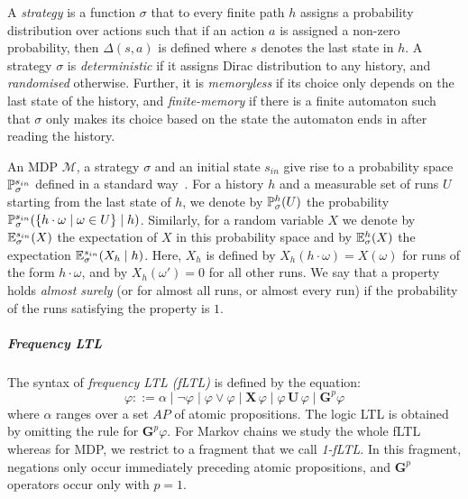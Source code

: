 \documentclass[a4paper,UKenglish]{lipics}
\newcommand{\mdp}{\mathcal{M}}
\newcommand{\tra}{\Delta}
\newcommand{\Gf}[1]{\mathbf{G}^{#1}}
\newcommand{\X}{\mathbf{X}\,}
\newcommand{\U}{\,\mathbf{U}\,}
\newcommand{\Ex}[3][]{\ifblank{#1}{\mathbb{E}_{#2}}{\mathbb{E}^{#1}_{#2}}(#3)}
\newcommand{\Prb}[2][]{\ifblank{#1}{\mathbb{P}_{#2}}{\mathbb{P}^{#1}_{#2}}}
\begin{document}
A {\em strategy} is a function $\sigma$ that to every finite path $h$ assigns a probability distribution over actions such that
if an action $a$ is assigned a non-zero probability, then $\tra(s,a)$ is defined where $s$ denotes the last state in $h$. A strategy $\sigma$ is {\em deterministic} if it assigns
Dirac distribution to any history, and {\em randomised} otherwise. Further, it is {\em memoryless} if its choice only depends on
the last state of the history, and {\em finite-memory} if there is a finite automaton such that $\sigma$ only makes its choice based on
the state the automaton ends in after reading the history.

An MDP $\mdp$, a strategy $\sigma$ and an initial state $s_{in}$ give rise to a probability space $\Prb[s_{in}]\sigma$ defined in a standard way~\cite{KSK76}. For a history $h$ and a measurable set of runs $U$ starting from the last state of $h$, we denote by $\Prb[h]{\sigma}(U)$ the probability
$\Prb[s_{in}]{\sigma}(\{h\cdot\omega \mid \omega \in U \} \mid h)$.
Similarly, for a random variable $X$ we denote by $\Ex[s_{in}]{\sigma}{X}$ the expectation of $X$ in this probability space and by $\Ex[h]{\sigma}{X}$ the expectation $\Ex[s_{in}]{\sigma}{X_h \mid h}$. Here, $X_h$ is defined by $X_h(h\cdot\omega) = X(\omega)$ for runs of the form $h\cdot \omega$, and by $X_h(\omega') = 0$ for all other runs.
We say that a property holds {\em almost surely} (or for almost all runs, or almost every run)
if the probability of the runs satisfying the property is $1$.


\subparagraph{Frequency LTL}
The syntax of {\em frequency LTL (fLTL)} is defined by the equation:
\[
\varphi ::= \alpha \mid \neg \varphi \mid \varphi \vee \varphi \mid \X \varphi \mid \varphi \U \varphi \mid \Gf{p} \varphi
\]
where $\alpha$ ranges over a set $\mathit{AP}$ of atomic propositions. The logic LTL is obtained by omitting the rule for
$\Gf{p} \varphi$.
For Markov chains we study the whole fLTL whereas for MDP, we restrict to a fragment that we call \emph{1-fLTL}. In this fragment, negations only occur immediately preceding atomic propositions, and $\Gf{p}$ operators occur only with $p=1$.
\end{document}
